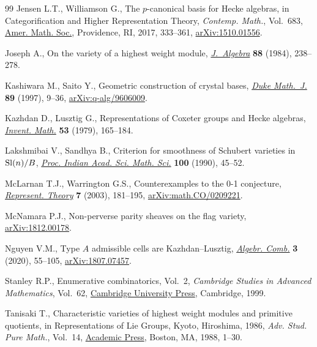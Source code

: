 \documentclass[10pt,a4paper]{amsart}
\numberwithin{equation}{section}
\begin{document}
\begin{thebibliography}{99}
Jensen L.T., Williamson G., The {$p$}-canonical basis for {H}ecke algebras, in
 Categorification and Higher Representation Theory, \textit{Contemp. Math.},
 Vol.~683, \href{https://doi.org/10.1090/conm/683}{Amer. Math. Soc.}, Providence, RI, 2017, 333--361,
 \href{https://arxiv.org/abs/1510.01556}{arXiv:1510.01556}.

Joseph A., On the variety of a highest weight module, \href{https://doi.org/10.1016/0021-8693(84)90100-5}{\textit{J.~Algebra}}
 \textbf{88} (1984), 238--278.

Kashiwara M., Saito Y., Geometric construction of crystal bases, \href{https://doi.org/10.1215/S0012-7094-97-08902-X}{\textit{Duke
 Math.~J.}} \textbf{89} (1997), 9--36, \href{https://arxiv.org/abs/q-alg/9606009}{arXiv:q-alg/9606009}.

Kazhdan D., Lusztig G., Representations of {C}oxeter groups and {H}ecke
 algebras, \href{https://doi.org/10.1007/BF01390031}{\textit{Invent. Math.}} \textbf{53} (1979), 165--184.

Lakshmibai V., Sandhya B., Criterion for smoothness of {S}chubert varieties in
 {${\rm Sl}(n)/B$}, \href{https://doi.org/10.1007/BF02881113}{\textit{Proc. Indian Acad. Sci. Math. Sci.}} \textbf{100}
 (1990), 45--52.

McLarnan T.J., Warrington G.S., Counterexamples to the 0-1 conjecture,
 \href{https://doi.org/10.1090/S1088-4165-03-00178-X}{\textit{Represent. Theory}} \textbf{7} (2003), 181--195,
 \href{https://arxiv.org/abs/math.CO/0209221}{arXiv:math.CO/0209221}.

McNamara P.J., Non-perverse parity sheaves on the flag variety,
 \href{https://arxiv.org/abs/1812.00178}{arXiv:1812.00178}.

Nguyen V.M., Type {$A$} admissible cells are {K}azhdan--{L}usztig,
 \href{https://doi.org/10.5802/alco.91}{\textit{Algebr. Comb.}} \textbf{3} (2020), 55--105, \href{https://arxiv.org/abs/1807.07457}{arXiv:1807.07457}.

Stanley R.P., Enumerative combinatorics, {V}ol.~2, \textit{Cambridge Studies in
 Advanced Mathematics}, Vol.~62, \href{https://doi.org/10.1017/CBO9780511609589}{Cambridge University Press}, Cambridge, 1999.

Tanisaki T., Characteristic varieties of highest weight modules and primitive
 quotients, in Representations of {L}ie Groups, {K}yoto, {H}iroshima, 1986,
 \textit{Adv. Stud. Pure Math.}, Vol.~14, \href{https://doi.org/10.2969/aspm/01410001}{Academic Press}, Boston, MA, 1988,
 1--30.


\end{thebibliography}
\end{document}
